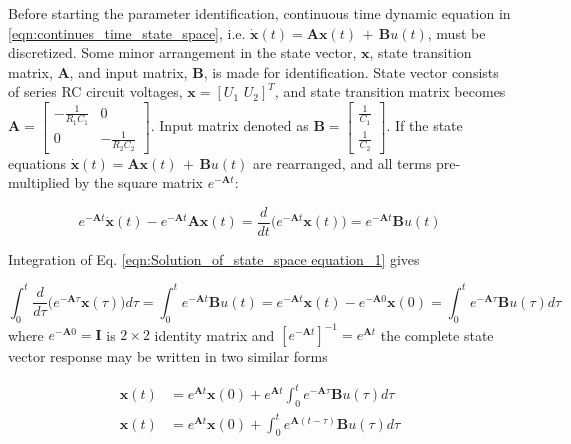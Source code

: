 \documentclass[12pt]{article}
\begin{document}
\par \noindent Before starting the parameter identification, continuous time dynamic equation  in \ref{eqn:continues_time_state_space}, i.e. $\dot{\bm{x}}(t) = \bm{A}\bm{x}(t)\,+\,\bm{B}u(t)$, must be discretized. Some minor arrangement in the state vector, $\bm{x}$, state transition matrix, $\bm{A}$, and input matrix, $\bm{B}$, is made for identification. State vector consists of series RC circuit voltages, $\bm{x} = [U_{1}\,\,U_{2}]^{T}$, and state transition matrix becomes $\bm{A} = \begin{bmatrix} -\frac{1}{R_{1}C_{1}} & 0 \\ 0 & -\frac{1}{R_{2}C_{2}} \end{bmatrix}$. Input matrix denoted as $\bm{B} = \begin{bmatrix} \frac{1}{C_{1}} \\ \frac{1}{C_{2}} \end{bmatrix}$. If the state equations $\dot{\bm{x}}(t) = \bm{A}\bm{x}(t)\,+\,\bm{B}u(t)$ are rearranged, and all terms pre-multiplied by the square matrix $e^{-\bm{A}t}$:

\begin{equation}
	\label{eqn:Solution_of_state_space equation_1}
	e^{-\bm{A}t}\dot{\bm{x}}(t) - e^{-\bm{A}t}\bm{A}\bm{x}(t) = \frac{d}{dt}\bigg(e^{-\bm{A}t}\bm{x}(t)\bigg)  = e^{-\bm{A}t}\bm{B}u(t)
\end{equation}

\noindent Integration of Eq. \ref{eqn:Solution_of_state_space equation_1} gives

\begin{equation}
	\label{eqn:Solution_of_state_space equation_2}
   \int_{0}^{t}\frac{d}{d\tau}\bigg(e^{-\bm{A}\tau}\bm{x}(\tau)\bigg) d\tau = \int_{0}^{t} e^{-\bm{A}t}\bm{B}u(t) =  e^{-\bm{A}t}\bm{x}(t) - e^{-\bm{A}0}\bm{x}(0) = \int_{0}^{t} e^{-\bm{A}\tau}\bm{B}u(\tau)d\tau
\end{equation}
\noindent where $e^{-\bm{A}0} = \bm{I}$ is $2\times2$ identity matrix and $[e^{-\bm{A}t}]^{-1} = e^{\bm{A}t}$ the complete state vector response may be written in two similar forms

\begin{subequations} 
	\label{eqn:Solution_of_state_space equation_3}
	\begin{align} 
	 \bm{x}(t) &= e^{\bm{A}t}\bm{x}(0)  + e^{\bm{A}t}\int_{0}^{t} e^{-\bm{A}\tau}\bm{B}u(\tau)d\tau\\
	 \bm{x}(t) &= e^{\bm{A}t}\bm{x}(0)  + \int_{0}^{t} e^{\bm{A}(t-\tau)}\bm{B}u(\tau)d\tau
	\end{align} 
\end{subequations}
\end{document}
